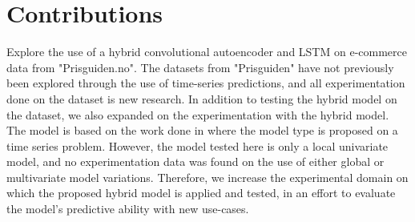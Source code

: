 
\section{Contributions}
\label{section:Discussion:Contributions}

Explore the use of a hybrid convolutional autoencoder and LSTM on e-commerce data from "Prisguiden.no".
The datasets from "Prisguiden" have not previously been explored through the use of time-series predictions,
and all experimentation done on the dataset is new research.
In addition to testing the hybrid model on the dataset,
we also expanded on the experimentation with the hybrid model.
The model is based on the work done in \cite{Zhao2019} where the model type is proposed on a time series problem.
However, the model tested here is only a local univariate model, and no experimentation data was found
on the use of either global or multivariate model variations.
Therefore, we increase the experimental domain on which the proposed hybrid model is applied and tested,
in an effort to evaluate the model's predictive ability with new use-cases.

